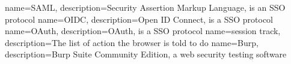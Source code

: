 

{
    name=SAML,
    description={Security Assertion Markup Language, is an SSO protocol}
}
{
    name=OIDC,
    description={Open ID Connect, is a SSO protocol} 
}
{
    name=OAuth,
    description={OAuth, is a SSO protocol}
}
{
    name=session track,
    description={The list of action the browser is told to do}
}
{
    name=Burp,
    description={Burp Suite Community Edition, a web security testing software}
}


\makeglossaries
